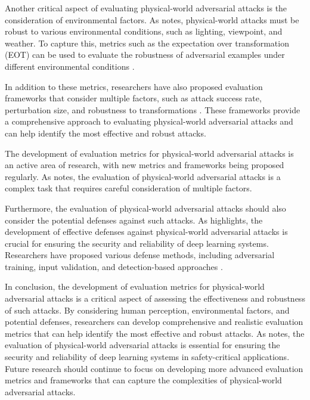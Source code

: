\documentclass[11pt,a4paper]{article}
\begin{document}
Another critical aspect of evaluating physical-world adversarial attacks is the consideration of environmental factors. As \cite{arxiv:1707.08945} notes, physical-world attacks must be robust to various environmental conditions, such as lighting, viewpoint, and weather. To capture this, metrics such as the expectation over transformation (EOT) can be used to evaluate the robustness of adversarial examples under different environmental conditions \cite{doi:10.1007/978-3-030-10925-7_4}.

In addition to these metrics, researchers have also proposed evaluation frameworks that consider multiple factors, such as attack success rate, perturbation size, and robustness to transformations \cite{arxiv:1802.06430}. These frameworks provide a comprehensive approach to evaluating physical-world adversarial attacks and can help identify the most effective and robust attacks.

The development of evaluation metrics for physical-world adversarial attacks is an active area of research, with new metrics and frameworks being proposed regularly. As \cite{doi:10.1186/s42400-018-0012-9} notes, the evaluation of physical-world adversarial attacks is a complex task that requires careful consideration of multiple factors. 

Furthermore, the evaluation of physical-world adversarial attacks should also consider the potential defenses against such attacks. As \cite{doi:10.1145/3274895.3274904} highlights, the development of effective defenses against physical-world adversarial attacks is crucial for ensuring the security and reliability of deep learning systems. Researchers have proposed various defense methods, including adversarial training, input validation, and detection-based approaches \cite{arxiv:1910.11099}.

In conclusion, the development of evaluation metrics for physical-world adversarial attacks is a critical aspect of assessing the effectiveness and robustness of such attacks. By considering human perception, environmental factors, and potential defenses, researchers can develop comprehensive and realistic evaluation metrics that can help identify the most effective and robust attacks. As \cite{doi:10.1109/cvpr42600.2020.01426} notes, the evaluation of physical-world adversarial attacks is essential for ensuring the security and reliability of deep learning systems in safety-critical applications. Future research should continue to focus on developing more advanced evaluation metrics and frameworks that can capture the complexities of physical-world adversarial attacks.
\end{document}
